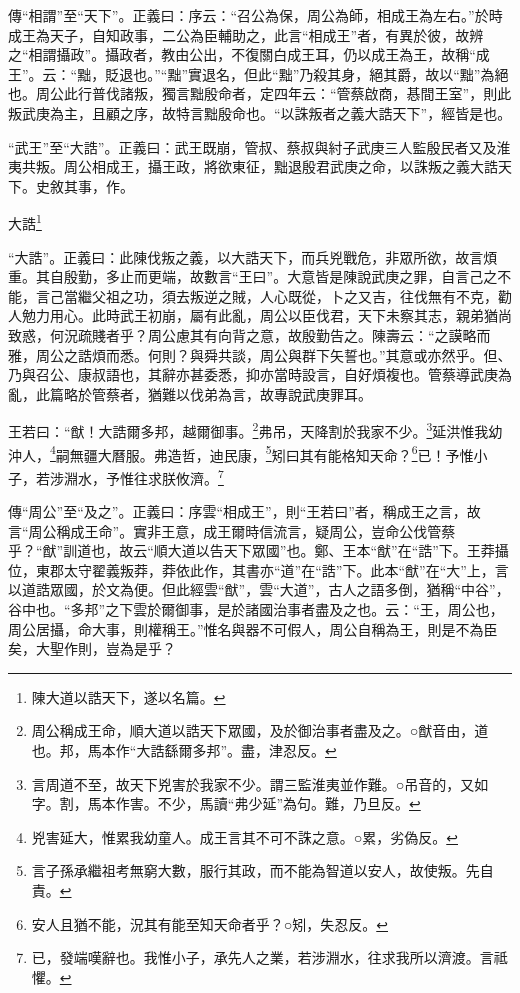 {\noindent\zhuan{}\fzbyks 傳“相謂”至“天下”。正義曰：序云：“召公為保，周公為師，相成王為左右。”於時成王為天子，自知政事，二公為臣輔助之，此言“相成王”者，有異於彼，故辨之“相謂攝政”。攝政者，教由公出，不復關白成王耳，仍以成王為王，故稱“成王”。云：“黜，貶退也。”“黜”實退名，但此“黜”乃殺其身，絕其爵，故以“黜”為絕也。周公此行普伐諸叛，獨言黜殷命者，定四年云：“管蔡啟商，惎間王室”，則此叛武庚為主，且顧之序，故特言黜殷命也。“以誅叛者之義大誥天下”，經皆是也。 \par}

{\noindent\shu{}\fzkt “武王”至“大誥”。正義曰：武王既崩，管叔、蔡叔與紂子武庚三人監殷民者又及淮夷共叛。周公相成王，攝王政，將欲東征，黜退殷君武庚之命，以誅叛之義大誥天下。史敘其事，作。 \par}

大誥\footnote{陳大道以誥天下，遂以名篇。}

{\noindent\shu{}\fzkt “大誥”。正義曰：此陳伐叛之義，以大誥天下，而兵兇戰危，非眾所欲，故言煩重。其自殷勤，多止而更端，故數言“王曰”。大意皆是陳說武庚之罪，自言己之不能，言己當繼父祖之功，須去叛逆之賊，人心既從，卜之又吉，往伐無有不克，勸人勉力用心。此時武王初崩，屬有此亂，周公以臣伐君，天下未察其志，親弟猶尚致惑，何況疏賤者乎？周公慮其有向背之意，故殷勤告之。陳壽云：“之謨略而雅，周公之誥煩而悉。何則？與舜共談，周公與群下矢誓也。”其意或亦然乎。但、乃與召公、康叔語也，其辭亦甚委悉，抑亦當時設言，自好煩複也。管蔡導武庚為亂，此篇略於管蔡者，猶難以伐弟為言，故專說武庚罪耳。 \par}

王若曰：“猷！大誥爾多邦，越爾御事。\footnote{周公稱成王命，順大道以誥天下眾國，及於御治事者盡及之。○猷音由，道也。邦，馬本作“大誥繇爾多邦”。盡，津忍反。}弗吊，天降割於我家不少。\footnote{言周道不至，故天下兇害於我家不少。謂三監淮夷並作難。○吊音的，又如字。割，馬本作害。不少，馬讀“弗少延”為句。難，乃旦反。}延洪惟我幼沖人，\footnote{兇害延大，惟累我幼童人。成王言其不可不誅之意。○累，劣偽反。}嗣無疆大曆服。弗造哲，迪民康，\footnote{言子孫承繼祖考無窮大數，服行其政，而不能為智道以安人，故使叛。先自責。}矧曰其有能格知天命？\footnote{安人且猶不能，況其有能至知天命者乎？○矧，失忍反。}已！予惟小子，若涉淵水，予惟往求朕攸濟。\footnote{已，發端嘆辭也。我惟小子，承先人之業，若涉淵水，往求我所以濟渡。言祗懼。}


{\noindent\zhuan{}\fzbyks 傳“周公”至“及之”。正義曰：序雲“相成王”，則“王若曰”者，稱成王之言，故言“周公稱成王命”。實非王意，成王爾時信流言，疑周公，豈命公伐管蔡乎？“猷”訓道也，故云“順大道以告天下眾國”也。鄭、王本“猷”在“誥”下。王莽攝位，東郡太守翟義叛莽，莽依此作，其書亦“道”在“誥”下。此本“猷”在“大”上，言以道誥眾國，於文為便。但此經雲“猷”，雲“大道”，古人之語多倒，猶稱“中谷”，谷中也。“多邦”之下雲於爾御事，是於諸國治事者盡及之也。云：“王，周公也，周公居攝，命大事，則權稱王。”惟名與器不可假人，周公自稱為王，則是不為臣矣，大聖作則，豈為是乎？ \par}

